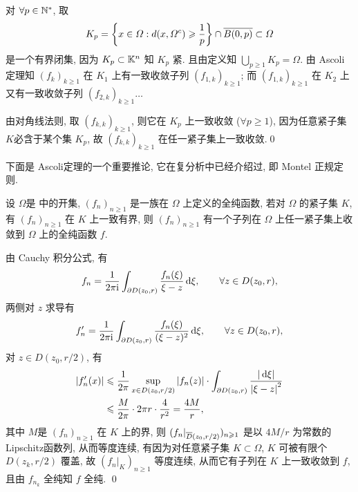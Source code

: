 \begin{Proof}
	对 $ \forall p\in\N^{*} $, 取
	\[
		K_{p}=\left\{ x\in\varOmega: d(x, \varOmega^{c})\geqslant\frac{1}{p} \right\}\cap \baro{B(0, p)}\subset\varOmega
	\]
	是一个有界闭集, 因为 $ K_{p}\subset\K^{n} $ 知 $ K_{p} $ 紧. 且由定义知 $ \bigcup_{p\geqslant1}K_{p}=\varOmega $. 由 Ascoli定理知 $ (f_{k})_{k\geqslant1} $ 在 $ K_{1} $ 上有一致收敛子列 $ (f_{1, k})_{k\geqslant1} $; 而 $ (f_{1, k})_{k\geqslant1} $ 在 $ K_{2} $ 上又有一致收敛子列 $ (f_{2, k})_{k\geqslant1}\dots $

	由对角线法则, 取 $ (f_{k, k})_{k\geqslant1} $, 则它在 $ K_{p} $ 上一致收敛 ($ \forall p\geqslant1 $), 因为任意紧子集$ K $必含于某个集 $ K_{p} $, 故 $ (f_{k, k})_{k\geqslant1} $ 在任一紧子集上一致收敛.\qed
\end{Proof}

下面是 Ascoli定理的一个重要推论, 它在复分析中已经介绍过, 即 Montel 正规定则.

\begin{Theorem}[Montel]
	设 $ \varOmega $是 \C 中的开集, $ (f_{n})_{n\geqslant1} $ 是一族在 $ \varOmega $ 上定义的全纯函数, 若对 $ \varOmega $ 的紧子集 $ K $, 有 $ (f_{n})_{n\geqslant1} $ 在 $ K $ 上一致有界, 则 $ (f_{n})_{n\geqslant1} $ 有一个子列在 $ \varOmega $ 上任一紧子集上收敛到 $ \varOmega $ 上的全纯函数 $ f $.
\end{Theorem}

\begin{Proof}
	由 Cauchy 积分公式, 有
	\[
		f_{n}=\frac{1}{2\pi \imag}\int_{\partial D(z_{0}, r)} \frac{f_{n}(\xi)}{\xi-z}\diff \xi,\qquad \forall z\in D(z_{0}, r),
	\]
	两侧对 $ z $ 求导有
	\[
		f'_{n}=\frac{1}{2\pi \imag}\int_{\partial D(z_{0}, r)} \frac{f_{n}(\xi)}{(\xi-z)^{2}}\diff \xi,\qquad \forall z\in D(z_{0}, r),
	\]
	对 $ z\in D(z_{0}, r/2) $, 有
	\[
		\begin{aligned}
			\abs{f'_{n}(x)} & \leqslant \frac{1}{2\pi}\sup_{x\in D(z_{0}, r/2)}\abs{f_{n}(z)}\cdot\int_{\partial D(z_{0}, r)}\frac{\abs{\diff \xi}}{\abs{\xi-z}^{2}} \\
			                & \leqslant \frac{M}{2\pi}\cdot 2\pi r\cdot \frac{4}{r^{2}}=\frac{4M}{r},
		\end{aligned}
	\]
	其中 $ M $是 $ (f_{n})_{n\geqslant1} $ 在 $ K $ 上的界, 则 $ (f_{n}|_{\baro{D}(z_{0}, r/2)})_{n\geqslant1} $ 是以 $ 4M/r $ 为常数的  Lipschitz函数列, 从而等度连续, 有因为对任意紧子集 $ K\subset\varOmega $,
	$ K $ 可被有限个 $ D(z_{k}, r/2) $ 覆盖, 故 $ (f_{n}|_{K})_{n\geqslant1} $ 等度连续, 从而它有子列在 $ K $ 上一致收敛到 $ f $, 且由 $ f_{n_{k}} $ 全纯知 $ f $ 全纯. \qed
\end{Proof}

